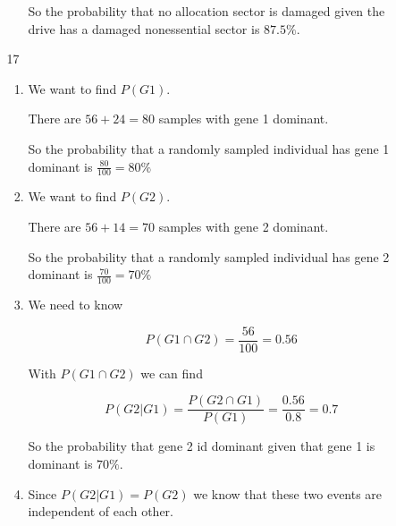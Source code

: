 \documentclass[12pt,letterpaper]{article}
\begin{document}
\begin{enumerate}
\begin{enumerate}
\begin{enumerate}[label=(\arabic*)]
              So the probability that no allocation sector is damaged given the drive has a damaged nonessential sector is $87.5\%$.
          \end{enumerate}
        \item [17]
          \begin{enumerate}[label=(\arabic*)]
            \item
              We want to find $P\left(G1\right)$.

              There are $56 + 24 = 80$ samples with gene 1 dominant.

              So the probability that a randomly sampled individual has gene 1 dominant is $\frac{80}{100} = 80\%$
            \item
              We want to find $P\left(G2\right)$.

              There are $56 + 14 = 70$ samples with gene 2 dominant.

              So the probability that a randomly sampled individual has gene 2 dominant is $\frac{70}{100} = 70\%$
            \item
              We need to know

              \[
                P\left(G1 \cap G2\right) = \frac{56}{100} = 0.56
              \]

              With $P\left(G1 \cap G2\right)$ we can find

              \[
                P\left(G2 | G1\right) = \frac{P\left(G2 \cap G1\right)}{P\left(G1\right)} = \frac{0.56}{0.8} = 0.7
              \]

              So the probability that gene 2 id dominant given that gene 1 is dominant is $70\%$.
            \item
              Since $P\left(G2 | G1\right) = P\left(G2\right)$ we know that these two events are independent of each other.


\end{enumerate}
\end{enumerate}
\end{enumerate}
\end{document}

